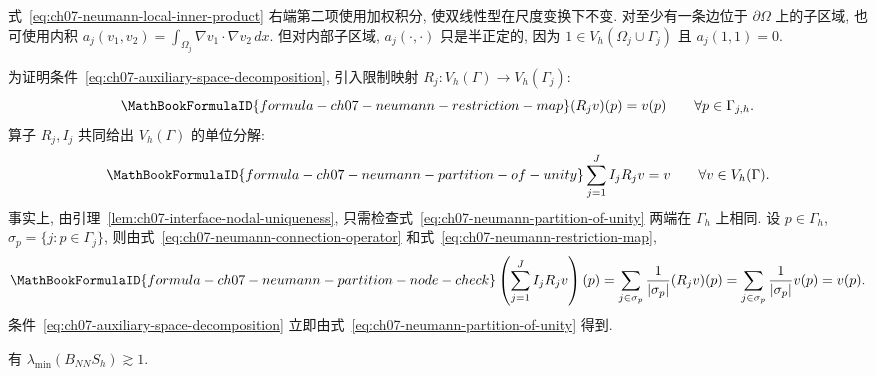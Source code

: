 \begin{Remark}
\label{rem:ch07-neumann-scaling-inner-product}
式~\eqref{eq:ch07-neumann-local-inner-product} 右端第二项使用加权积分, 使双线性型在尺度变换下不变. 对至少有一条边位于 $\partial\Omega$ 上的子区域, 也可使用内积 $a_j(v_1,v_2)=\int_{\Omega_j}\nabla v_1\cdot\nabla v_2\,dx$. 但对内部子区域, $a_j(\cdot,\cdot)$ 只是半正定的, 因为 $1\in V_h(\Omega_j\cup\Gamma_j)$ 且 $a_j(1,1)=0$.
\end{Remark}

为证明条件~\eqref{eq:ch07-auxiliary-space-decomposition}, 引入限制映射 $R_j:V_h(\Gamma)\longrightarrow V_h(\Gamma_j)$:
\begin{equation}
\MathBookFormulaID{formula-ch07-neumann-restriction-map}
\label{eq:ch07-neumann-restriction-map}
(R_jv)(p)=v(p)
\qquad\forall p\in\Gamma_{j,h}.
\end{equation}
算子 $R_j,I_j$ 共同给出 $V_h(\Gamma)$ 的单位分解:
\begin{equation}
\MathBookFormulaID{formula-ch07-neumann-partition-of-unity}
\label{eq:ch07-neumann-partition-of-unity}
\sum_{j=1}^{J}I_jR_jv=v
\qquad\forall v\in V_h(\Gamma).
\end{equation}
事实上, 由引理~\ref{lem:ch07-interface-nodal-uniqueness}, 只需检查式~\eqref{eq:ch07-neumann-partition-of-unity} 两端在 $\Gamma_h$ 上相同. 设 $p\in\Gamma_h$, $\sigma_p=\{j:p\in\Gamma_j\}$, 则由式~\eqref{eq:ch07-neumann-connection-operator} 和式~\eqref{eq:ch07-neumann-restriction-map},
\[
\MathBookFormulaID{formula-ch07-neumann-partition-node-check}
\left(\sum_{j=1}^{J}I_jR_jv\right)(p)
=\sum_{j\in\sigma_p}\frac1{|\sigma_p|}(R_jv)(p)
=\sum_{j\in\sigma_p}\frac1{|\sigma_p|}v(p)=v(p).
\]
条件~\eqref{eq:ch07-auxiliary-space-decomposition} 立即由式~\eqref{eq:ch07-neumann-partition-of-unity} 得到.

\begin{Lemma}
\label{lem:ch07-neumann-minimum-eigenvalue}
有 $\lambda_{\min}(B_{NN}S_h)\gtrsim1$.
\end{Lemma}

